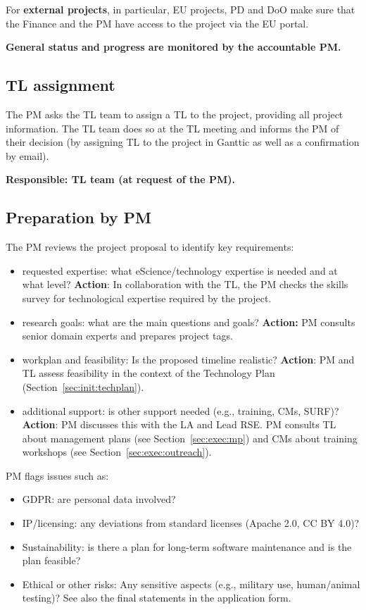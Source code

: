 For \textbf{external projects}, in particular, EU projects, PD and DoO make sure that the Finance and the PM have access to the project via the EU portal.

\textbf{General status and progress are monitored by the accountable PM.}

\subsection{TL assignment}
\label{sec:init:tl-assign}
The PM asks the TL team to assign a TL to the project, providing all project information. The TL team does so at the TL
meeting and informs the PM of their decision (by assigning TL to the project in Ganttic as well as a confirmation by
email). %

\textbf{Responsible: TL team (at request of the PM).}

\subsection{Preparation by PM}
The PM reviews the project proposal to identify key requirements:
\begin{itemize}
\item requested expertise: what eScience/technology expertise is needed and at what level?
\textbf{Action}: In collaboration with the TL, the PM checks the skills survey for technological expertise required by the project.
\item research goals: what are the main questions and goals? \textbf{Action:} PM consults senior domain experts and prepares project tags.
\item workplan and feasibility: Is the proposed timeline realistic? \textbf{Action}: PM and TL assess feasibility in the context of the Technology Plan (Section~\ref{sec:init:techplan}).
\item additional support: is other support needed (e.g., training, CMs, SURF)? \textbf{Action}: PM discusses this with the LA and Lead RSE. PM consults TL about management plans (see Section~\ref{sec:exec:mp}) and CMs about training workshops (see
Section~\ref{sec:exec:outreach}).
\end{itemize}
PM flags issues such as:
\begin{itemize}
\item GDPR: are personal data involved?
\item IP/licensing: any deviations from standard licenses (Apache 2.0, CC BY 4.0)? 
\item Sustainability: is there a plan for long-term software maintenance and is the plan feasible?
\item Ethical or other risks: Any sensitive aspects (e.g., military use, human/animal testing)? See also the final statements in the application form.
\end{itemize}

